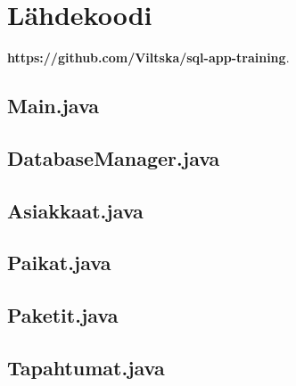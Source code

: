 \documentclass[11pt,a4paper]{article}
\begin{document}
\section{Lähdekoodi}
\textbf{https://github.com/Viltska/sql-app-training}.

\subsection*{Main.java}

\subsection*{DatabaseManager.java}

\subsection*{Asiakkaat.java}

\subsection*{Paikat.java}

\subsection*{Paketit.java}

\subsection*{Tapahtumat.java}

\end{document}
